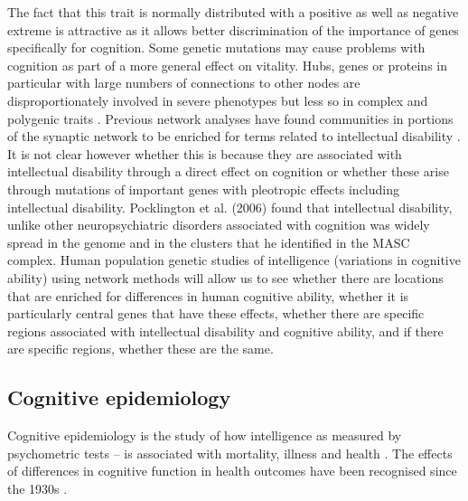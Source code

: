 The fact that this trait is normally distributed with a positive as well as negative extreme is attractive as it allows better discrimination of the importance of genes specifically for cognition. Some genetic mutations may cause problems with cognition as part of a more general effect on vitality. Hubs, genes or proteins in particular with large numbers of connections to other nodes are disproportionately involved in severe phenotypes but less so in complex and polygenic traits \cite{barabasi2011network} \cite{bayes2011characterization}. Previous network analyses have found communities in portions of the synaptic network to be enriched for terms related to intellectual disability \cite{pocklington2006proteomes}. It is not clear however whether this is because they are associated with intellectual disability through a direct effect on cognition or whether these arise through mutations of important genes with pleotropic effects including intellectual disability. %
Pocklington et al. (2006) found that intellectual disability, unlike other neuropsychiatric disorders associated with cognition was widely spread in the genome and in the clusters that he identified in the MASC complex\cite{pocklington2006proteomes}. Human population genetic studies of intelligence (variations in cognitive ability) using network methods will allow us to see whether there are locations that are enriched for differences in human cognitive ability, whether it is particularly central genes that have these effects, whether there are specific regions associated with intellectual disability and cognitive ability, and if there are specific regions, whether these are the same.


\subsection{Cognitive epidemiology}

Cognitive epidemiology is the study of how intelligence as measured by psychometric tests – is associated with mortality, illness and health %
\cite{deary2010cognitive}. The effects of differences in cognitive function in health outcomes have been recognised since the 1930s \cite{deary2007cognitive}.%

